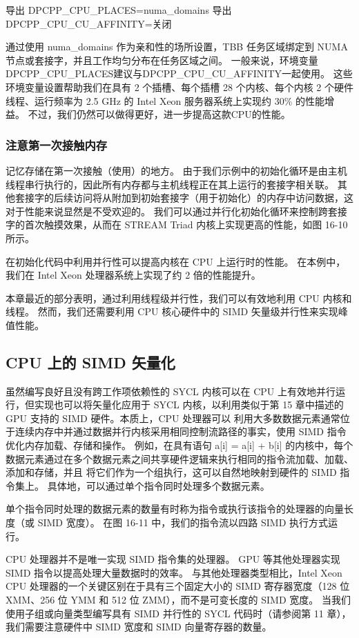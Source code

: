 导出 DPCPP\_CPU\_PLACES=numa\_domains 导出 DPCPP\_CPU\_CU\_AFFINITY=关闭

通过使用 numa\_domains 作为亲和性的场所设置，TBB 任务区域绑定到 NUMA 节点或套接字，并且工作均匀分布在任务区域之间。 一般来说，环境变量DPCPP\_CPU\_PLACES建议与DPCPP\_CPU\_CU\_AFFINITY一起使用。 这些环境变量设置帮助我们在具有 2 个插槽、每个插槽 28 个内核、每个内核 2 个硬件线程、运行频率为 2.5 GHz 的 Intel Xeon 服务器系统上实现约 30\% 的性能增益。 不过，我们仍然可以做得更好，进一步提高这款CPU的性能。

\subsubsection{注意第一次接触内存}
记忆存储在第一次接触（使用）的地方。 由于我们示例中的初始化循环是由主机线程串行执行的，因此所有内存都与主机线程正在其上运行的套接字相关联。 其他套接字的后续访问将从附加到初始套接字（用于初始化）的内存中访问数据，这对于性能来说显然是不受欢迎的。 我们可以通过并行化初始化循环来控制跨套接字的首次触摸效果，从而在 STREAM Triad 内核上实现更高的性能，如图 16-10 所示。

在初始化代码中利用并行性可以提高内核在 CPU 上运行时的性能。 在本例中，我们在 Intel Xeon 处理器系统上实现了约 2 倍的性能提升。

本章最近的部分表明，通过利用线程级并行性，我们可以有效地利用 CPU 内核和线程。 然而，我们还需要利用 CPU 核心硬件中的 SIMD 矢量级并行性来实现峰值性能。

\subsection{CPU 上的 SIMD 矢量化}
虽然编写良好且没有跨工作项依赖性的 SYCL 内核可以在 CPU 上有效地并行运行，但实现也可以将矢量化应用于 SYCL 内核，以利用类似于第 15 章中描述的 GPU 支持的 SIMD 硬件。本质上，CPU 处理器可以 利用大多数数据元素通常位于连续内存中并通过数据并行内核采用相同控制流路径的事实，使用 SIMD 指令优化内存加载、存储和操作。 例如，在具有语句 a[i] = a[i] + b[i] 的内核中，每个数据元素通过在多个数据元素之间共享硬件逻辑来执行相同的指令流加载、加载、添加和存储，并且 将它们作为一个组执行，这可以自然地映射到硬件的 SIMD 指令集上。 具体地，可以通过单个指令同时处理多个数据元素。

单个指令同时处理的数据元素的数量有时称为指令或执行该指令的处理器的向量长度（或 SIMD 宽度）。 在图 16-11 中，我们的指令流以四路 SIMD 执行方式运行。

CPU 处理器并不是唯一实现 SIMD 指令集的处理器。 GPU 等其他处理器实现 SIMD 指令以提高处理大量数据时的效率。 与其他处理器类型相比，Intel Xeon CPU 处理器的一个关键区别在于具有三个固定大小的 SIMD 寄存器宽度（128 位 XMM、256 位 YMM 和 512 位 ZMM），而不是可变长度的 SIMD 宽度。 当我们使用子组或向量类型编写具有 SIMD 并行性的 SYCL 代码时（请参阅第 11 章），我们需要注意硬件中 SIMD 宽度和 SIMD 向量寄存器的数量。

